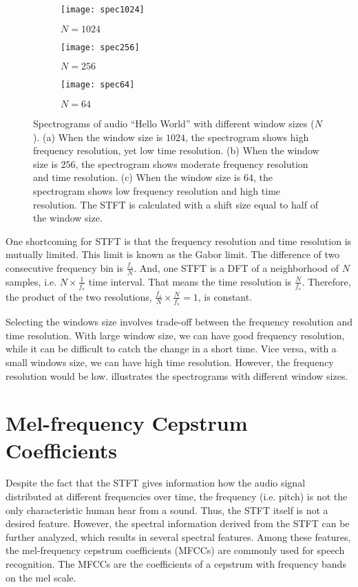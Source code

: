 \documentclass[12pt,final,twoside]{report}
\begin{document}
\begin{figure}[t]
  \centering
  \begin{subfigure}[b]{.8\textwidth}
    \texttt{[image: spec1024]}
    \caption{$N=1024$}
    \label{fig:spec1024}
  \end{subfigure}

  \begin{subfigure}[b]{.8\textwidth}
    \texttt{[image: spec256]}
    \caption{$N=256$}
    \label{fig:spec256}
  \end{subfigure}

  \begin{subfigure}[b]{.8\textwidth}
    \texttt{[image: spec64]}
    \caption{$N=64$}
    \label{fig:spec64}
  \end{subfigure}

  \caption[Spectrograms with different window sizes]{Spectrograms of audio ``Hello World'' with different window sizes ($N$). (a) When the window size is $1024$, the spectrogram shows high frequency resolution, yet low time resolution.
    (b) When the window size is $256$, the spectrogram shows moderate frequency resolution and time resolution.
    (c) When the window size is $64$, the spectrogram shows low frequency resolution and high time resolution.
  The STFT is calculated with a shift size equal to half of the window size. }
  \label{fig:spec}
\end{figure}

One shortcoming for STFT is that the frequency resolution and time resolution is mutually limited. This limit is known as the Gabor limit. The difference of two consecutive frequency bin is $\frac{f_s}{N}$. And, one STFT is a DFT of a neighborhood of $N$ samples, i.e. $N \times \frac{1}{f_s}$ time interval. That means the time resolution is $\frac{N}{f_s}$. Therefore, the product of the two resolutions, $\frac{f_s}{N} \times \frac{N}{f_s} = 1$, is constant. 

Selecting the windows size involves trade-off between the frequency resolution and time resolution. With large window size, we can have good frequency resolution, while it can be difficult to catch the change in a short time. Vice versa, with a small windows size, we can have high time resolution. However, the frequency resolution would be low.  illustrates the spectrograms with different window sizes.

\section{Mel-frequency Cepstrum Coefficients}
Despite the fact that the STFT gives information how the audio signal distributed at different frequencies over time, the frequency (i.e. pitch) is not the only characteristic human hear from a sound. Thus, the STFT itself is not a desired feature. However, the spectral information derived from the STFT can be further analyzed, which results in several spectral features. Among these features, the mel-frequency cepstrum coefficients (MFCCs) are commonly used for speech recognition.
The MFCCs are the coefficients of a cepstrum with frequency bands on the mel scale.
\end{document}
